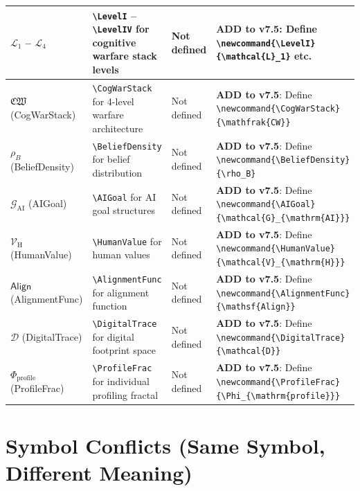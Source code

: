 \documentclass[11pt]{article}
\begin{document}
\begin{longtable}{L{2.5cm}|L{3.5cm}|L{2.5cm}|L{4.5cm}}
\midrule
$\mathcal{L}_1$ -- $\mathcal{L}_4$
& \verb|\LevelI| -- \verb|\LevelIV| for cognitive warfare stack levels
& Not defined
& \textbf{ADD to v7.5}: Define \verb|\newcommand{\LevelI}{\mathcal{L}_1}| etc. \\

\midrule
$\mathfrak{CW}$ (CogWarStack)
& \verb|\CogWarStack| for 4-level warfare architecture
& Not defined
& \textbf{ADD to v7.5}: Define \verb|\newcommand{\CogWarStack}{\mathfrak{CW}}| \\

\midrule
$\rho_B$ (BeliefDensity)
& \verb|\BeliefDensity| for belief distribution
& Not defined
& \textbf{ADD to v7.5}: Define \verb|\newcommand{\BeliefDensity}{\rho_B}| \\

\midrule
$\mathcal{G}_{\mathrm{AI}}$ (AIGoal)
& \verb|\AIGoal| for AI goal structures
& Not defined
& \textbf{ADD to v7.5}: Define \verb|\newcommand{\AIGoal}{\mathcal{G}_{\mathrm{AI}}}| \\

\midrule
$\mathcal{V}_{\mathrm{H}}$ (HumanValue)
& \verb|\HumanValue| for human values
& Not defined
& \textbf{ADD to v7.5}: Define \verb|\newcommand{\HumanValue}{\mathcal{V}_{\mathrm{H}}}| \\

\midrule
$\mathsf{Align}$ (AlignmentFunc)
& \verb|\AlignmentFunc| for alignment function
& Not defined
& \textbf{ADD to v7.5}: Define \verb|\newcommand{\AlignmentFunc}{\mathsf{Align}}| \\

\midrule
$\mathcal{D}$ (DigitalTrace)
& \verb|\DigitalTrace| for digital footprint space
& Not defined
& \textbf{ADD to v7.5}: Define \verb|\newcommand{\DigitalTrace}{\mathcal{D}}| \\

\midrule
$\Phi_{\mathrm{profile}}$ (ProfileFrac)
& \verb|\ProfileFrac| for individual profiling fractal
& Not defined
& \textbf{ADD to v7.5}: Define \verb|\newcommand{\ProfileFrac}{\Phi_{\mathrm{profile}}}| \\

\end{longtable}

\section{Symbol Conflicts (Same Symbol, Different Meaning)}
\end{document}
